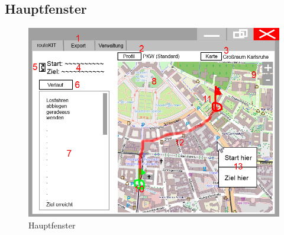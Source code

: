\documentclass[a4paper, 11pt]{article}
\begin{document}
\subsection{Hauptfenster}
\begin{figure}[H]
\centering
\includegraphics[width=0.9\linewidth]{mockup_screenshot_main}
\caption{Hauptfenster}
\label{fig:mockupscreenshotmain}
\end{figure}
\end{document}
